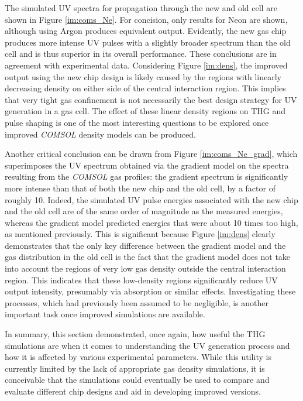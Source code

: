 \documentclass[a4paper]{jpconf}
\begin{document}
The simulated UV spectra for propagation through the new and old cell are shown in Figure \ref{im:coms_Ne}. For concision, only results for Neon are shown, although using Argon produces equivalent output. Evidently, the new gas chip produces more intense UV pulses with a slightly broader spectrum than the old cell and is thus superior in its overall performance. These conclusions are in agreement with experimental data. Considering Figure \ref{im:dens}, the improved output using the new chip design is likely caused by the regions with linearly decreasing density on either side of the central interaction region. This implies that very tight gas confinement is not necessarily the best design strategy for UV generation in a gas cell. The effect of these linear density regions on THG and pulse shaping is one of the most interesting questions to be explored once improved \textit{COMSOL} density models can be produced. \par 
Another critical conclusion can be drawn from Figure \ref{im:coms_Ne_grad}, which superimposes the UV spectrum obtained via the gradient model on the spectra resulting from the \textit{COMSOL} gas profiles: the gradient spectrum is significantly more intense than that of both the new chip and the old cell, by a factor of roughly 10. Indeed, the simulated UV pulse energies associated  with the new chip and the old cell are of the same order of magnitude as the measured energies, whereas the gradient model predicted energies that were about 10 times too high, as mentioned previously. This is significant because Figure \ref{im:dens} clearly demonstrates that the only key difference between the gradient model and the gas distribution in the old cell is the fact that the gradient model does not take into account the regions of very low gas density outside the central interaction region. This indicates that these low-density regions significantly reduce UV output intensity, presumably via absorption or similar effects. Investigating these processes, which had previously been assumed to be negligible, is  another important task once improved simulations are available. \par 
In summary, this section demonstrated, once again, how useful the THG simulations are when it comes to understanding the UV generation process and how it is affected by various experimental parameters. While this utility is currently limited by the lack of appropriate gas density simulations, it is conceivable that the simulations could eventually be used to compare and evaluate different chip designs and aid in developing improved versions. 
\end{document}
